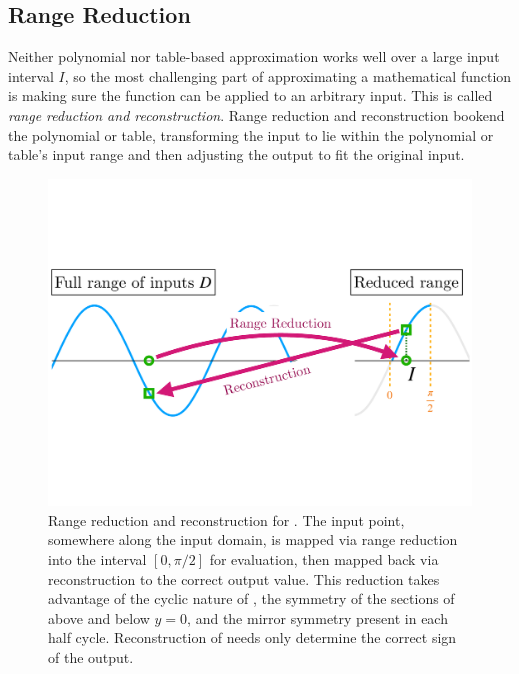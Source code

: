 \documentclass[paper.tex]{subfiles}
\begin{document}
\subsection{Range Reduction}

Neither polynomial nor table-based approximation
  works well over a large input interval $I$,
  so the most challenging part of approximating a mathematical function
  is making sure the function can be applied to an arbitrary input.
This is called \textit{range reduction and reconstruction}.
Range reduction and reconstruction bookend the polynomial or table,
  transforming the input to lie within the polynomial or table's input range
  and then adjusting the output to fit the original input.

\begin{figure}
\hfill%
\begin{minipage}[c]{.56\textwidth}
\includegraphics[width=\textwidth]{images/range_reduction.pdf}
\end{minipage}\hfill
\begin{minipage}[c]{0.38\textwidth}
\caption{
\small
Range reduction and reconstruction for .
The input point, somewhere along the input domain, is mapped via range reduction
  into the interval $[0,\pi/2]$ for evaluation, then mapped back via
  reconstruction to the correct output value.
This reduction takes advantage of the cyclic nature of , the symmetry of
  the sections of  above and below $y=0$, and the mirror symmetry
  present in each half cycle.
Reconstruction of  needs only determine the correct sign of the output.
}
\end{minipage}\hfill
\label{fig:range}
\end{figure}
\end{document}

